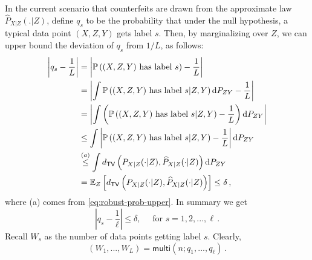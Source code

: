 \documentclass[11pt]{article}
\def\hP{\widehat{P}}
\def\tv{\mathsf{TV}}
\begin{document}
	In the current scenario that counterfeits are drawn from the approximate law $\hP_{X|Z}(.|Z)$, define $q_s$ to be the probability that under the null hypothesis, a typical data point $(X,Z,Y)$ gets label $s$. Then, by marginalizing over $Z$, we can upper bound the  deviation of $q_s$ from $1/L$, as follows: 
	\begin{align*}
		\left|q_s-\frac{1}{L}\right|	&=\left|\prob\left( (X,Z,Y) \text{ has label } s  \right)- \frac{1}{L} \right|\nonumber\\
	&= \left|\int \prob\left( (X,Z,Y) \text{ has label } s|Z,Y  \right)\de P_{ZY}- \frac{1}{L} \right|\nonumber\\
		&= \left|\int \left(\prob\left( (X,Z,Y) \text{ has label } s|Z,Y  \right)-\frac{1}{L}\right)\de P_{ZY}\right|\nonumber\\
		&\leq  \int \left|\prob\left( (X,Z,Y) \text{ has label } s|Z,Y  \right)-\frac{1}{L}\right|\de P_{ZY}\nonumber\\
		&\overset{(a)}{\leq} \int d_{\tv}\left( P_{X|Z}(\cdot|Z),\hP_{X|Z}(\cdot|Z)  \right) \de P_{ZY}\\
		&=  \E_{Z}\left[ d_{\tv}\left( P_{X|Z}(\cdot|Z),\hP_{X|Z}(\cdot|Z)  \right) \right]\leq \delta\,,
	\end{align*}
	where (a) comes from \eqref{eq:robust-prob-upper}.  In summary we get 
	\begin{equation}\label{eq:robust-prob-upper2}
		\left|q_s-\frac{1}{\ell}\right|\leq \delta,\quad \text{ for } s=1,2,...,\ell\,.
	\end{equation}
	Recall $W_s$ as the number of data points getting label $s$. Clearly,
	\[
	(W_1,...,W_L)=\mathsf{multi}\left(n;q_1,...,q_\ell\right)\,.
	\]
	
\end{document}
